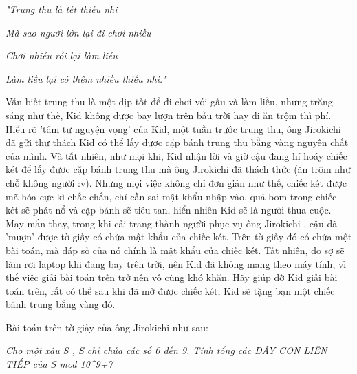 \emph{"Trung thu là tết thiếu nhi}

\emph{Mà sao người lớn lại đi chơi nhiều}

\emph{Chơi nhiều rồi lại làm liều}

\emph{Làm liều lại có thêm nhiều thiếu nhi."}

Vẫn biết trung thu là một dịp tốt để đi chơi với gấu và làm liều, nhưng trăng sáng như thế, Kid không được bay lượn trên bầu trời hay đi ăn trộm thì phí. Hiểu rõ 'tâm tư nguyện vọng' của Kid, một tuần trước trung thu, ông Jirokichi đã gửi thư thách Kid có thể lấy được cặp bánh trung thu bằng vàng nguyên chất của mình. Và tất nhiên, như mọi khi, Kid nhận lời và giờ cậu đang hí hoáy chiếc két để lấy được cặp bánh trung thu mà ông Jirokichi đã thách thức (ăn trộm như chỗ không người :v). Nhưng mọi việc không chỉ đơn giản như thế, chiếc két được mã hóa cực kì chắc chắn, chỉ cần sai mật khẩu nhập vào, quả bom trong chiếc két sẽ phát nổ và cặp bánh sẽ tiêu tan, hiển nhiên Kid sẽ là người thua cuộc. May mắn thay, trong khi cải trang thành người phục vụ ông Jirokichi , cậu đã 'mượn' được tờ giấy có chứa mật khẩu của chiếc két. Trên tờ giấy đó có chứa một bài toán, mà đáp số của nó chính là mật khẩu của chiếc két. Tất nhiên, do sợ sẽ làm rơi laptop khi đang bay trên trời, nên Kid đã không mang theo máy tính, vì thế việc giải bài toán trên trở nên vô cùng khó khăn. Hãy giúp đỡ Kid giải bài toán trên, rất có thể sau khi đã mở được chiếc két, Kid sẽ tặng bạn một chiếc bánh trung bằng vàng đó.

Bài toán trên tờ giấy của ông Jirokichi như sau:

\emph{Cho một xâu S , S chỉ chứa các số 0 đến 9. Tính tổng các DÃY CON LIÊN TIẾP của S mod 10^9+7 }